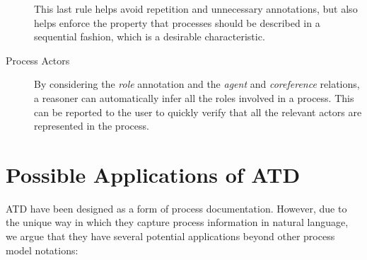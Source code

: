\begin{description}
{    This last rule helps avoid repetition and unnecessary annotations, but also
    helps enforce the property that processes should be described in a
    sequential fashion, which is a desirable characteristic.}
  \item[Process Actors]{By considering the \emph{role} annotation and the
      \emph{agent} and \emph{coreference} relations, a reasoner can
      automatically infer all the roles involved in a process. This can be
      reported to the user to quickly verify that all the relevant actors are
      represented in the process.}
\end{description}

\section{Possible Applications of ATD}

ATD have been designed as a form of process documentation. However, due to the
unique way in which they capture process information in natural language, we
argue that they have several potential applications beyond other process
model notations:

